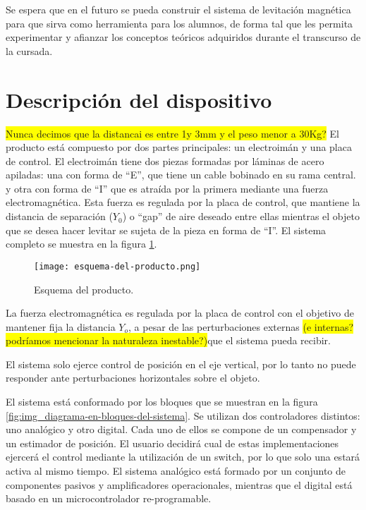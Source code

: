 \noindent Se espera que en el futuro se pueda construir el sistema de levitación magnética para que sirva como herramienta para los alumnos, de forma tal que les permita experimentar y afianzar los conceptos teóricos adquiridos durante el transcurso de la cursada.



\section{Descripción del dispositivo}
\colorbox{yellow}{Nunca decimos que la distancai es entre 1y 3mm y el peso menor a 30Kg?}
\noindent El producto está compuesto por dos partes principales: un electroimán y una placa de control. El electroimán tiene dos piezas formadas por láminas de acero apiladas: una con forma de “E”, que tiene un cable bobinado en su rama central. y otra con forma de “I” que es atraída por la primera mediante una fuerza electromagnética. Esta fuerza es regulada por la placa de control, que mantiene la distancia de separación ($Y_0$) o “gap” de aire deseado entre ellas mientras el objeto que se desea hacer levitar se sujeta de la pieza en forma de “I”. El sistema completo se muestra en la figura \ref{fig:img_Esquema-del-producto}.

\begin{figure}[H]
	\centering
	\texttt{[image: esquema-del-producto.png]}
	\caption{Esquema del producto.}
	\label{fig:img_Esquema-del-producto}
\end{figure}

\noindent La fuerza electromagnética es regulada por la placa de control con el objetivo de mantener fija la distancia $Y_{o}$, a pesar de las perturbaciones externas \colorbox{yellow}{(e internas? podríamos mencionar la naturaleza inestable?)}que el sistema pueda recibir. 


\noindent El sistema solo ejerce control de posición en el eje vertical, por lo tanto no puede responder ante perturbaciones horizontales sobre el objeto.


\noindent El sistema está conformado por los bloques que se muestran en la figura \ref{fig:img_diagrama-en-bloques-del-sistema}. Se utilizan dos controladores distintos: uno analógico y otro digital. Cada uno de ellos se compone de un compensador y un estimador de posición.  El usuario decidirá cual de estas implementaciones ejercerá el control mediante la utilización de un switch, por lo que solo una estará activa al mismo tiempo. El sistema analógico está formado por un conjunto de componentes pasivos y amplificadores operacionales, mientras que el digital está basado en un microcontrolador re-programable.

